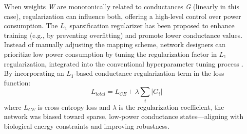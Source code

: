\noindent When weights \textit{W} are monotonically related to conductances \textit{G} (linearly in this case), regularization can influence both, offering a high-level control over power consumption. The $L_1$ sparsification regularizer \cite{han2015learning} has been proposed to enhance training (e.g., by preventing overfitting) and promote lower conductance values. Instead of manually adjusting the mapping scheme, network designers can prioritize low power consumption by tuning the regularization factor in $L_1$ regularization, integrated into the conventional hyperparameter tuning process \cite{feurer2019hyperparameter}. By incorporating an 
$L_1$-based conductance regularization term in the loss function:
\begin{equation}
    L_{total} = L_{CE} + \lambda \sum_{i}|G_i| \label{eq:7.3}
\end{equation}
\noindent where $L_{CE}$ is cross-entropy loss and $\lambda$ is the regularization coefficient, the network was biased toward sparse, low-power conductance states—aligning with biological energy constraints and improving robustness.\\


